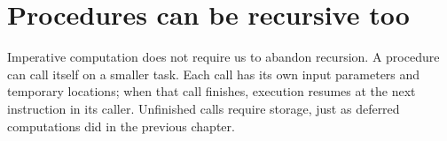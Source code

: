 %
%
%

\section{Procedures can be recursive too}

Imperative computation does not require us to abandon recursion. A
procedure can call itself on a smaller task. Each call has its own input
parameters and temporary locations; when that call finishes, execution
resumes at the next instruction in its caller. Unfinished calls require
storage, just as deferred computations did in the previous chapter.

